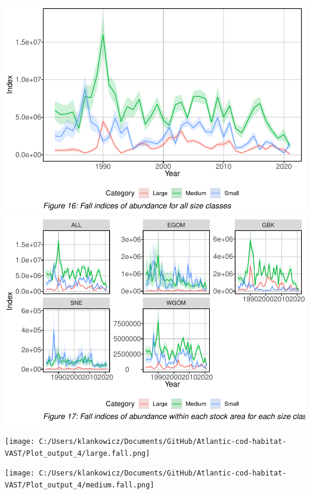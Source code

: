 \documentclass[
]{article}
\let\origfigure\figure
\let\endorigfigure\endfigure
\renewenvironment{figure}[1][2] {
    \expandafter\origfigure\expandafter[H]
} {
    \endorigfigure
}
\begin{document}
\includegraphics{ToR1_TechPaper_files/figure-latex/fall index-1.pdf} \includegraphics{ToR1_TechPaper_files/figure-latex/fall index-2.pdf}

\begin{figure}
\centering
\texttt{[image: C:/Users/klankowicz/Documents/GitHub/Atlantic-cod-habitat-VAST/Plot\_output\_4/large.fall.png]}
\caption{Figure 18: Large cod center of gravity and effective area occupied for all stock areas, fall seasons 1982 - 2021.}
\end{figure}

\begin{figure}
\centering
\texttt{[image: C:/Users/klankowicz/Documents/GitHub/Atlantic-cod-habitat-VAST/Plot\_output\_4/medium.fall.png]}
\caption{Figure 19: Medium cod center of gravity and effective area occupied for all stock areas, fall seasons 1982 - 2021.}
\end{figure}
\end{document}
